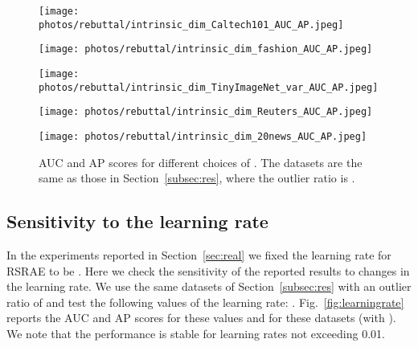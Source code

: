 \documentclass{article} \usepackage{iclr2020_conference,times}
\def\Secref#1{Section~\ref{#1}}
\begin{document}
\begin{figure}[htbp]
\centering
\begin{minipage}[t]{0.48\textwidth}
\centering
\texttt{[image: photos/rebuttal/intrinsic\_dim\_Caltech101\_AUC\_AP.jpeg]}
\end{minipage}
\begin{minipage}[t]{0.48\textwidth}
\centering
\texttt{[image: photos/rebuttal/intrinsic\_dim\_fashion\_AUC\_AP.jpeg]}
\end{minipage}


\centering
\begin{minipage}[t]{0.48\textwidth}
\centering
\texttt{[image: photos/rebuttal/intrinsic\_dim\_TinyImageNet\_var\_AUC\_AP.jpeg]}

\end{minipage}
\begin{minipage}[t]{0.48\textwidth}
\centering
\texttt{[image: photos/rebuttal/intrinsic\_dim\_Reuters\_AUC\_AP.jpeg]}
\end{minipage}


\centering
\begin{minipage}[t]{0.48\textwidth}
\centering
\texttt{[image: photos/rebuttal/intrinsic\_dim\_20news\_AUC\_AP.jpeg]}

\end{minipage}


\caption{AUC and AP scores for different choices of . The datasets are the same as those in \Secref{subsec:res}, where the outlier ratio is .
\label{fig:intrinsicdim}
}
\end{figure}




\newpage
\subsection{Sensitivity to the learning rate}
\label{subsec:learningrate}


In the experiments reported in \Secref{sec:real} we fixed the learning rate for RSRAE to be . Here we check the sensitivity of the reported results to changes in the learning rate.
We use the same datasets of \Secref{subsec:res} with an outlier ratio of  and test the following values of the learning rate: .  Fig.~\ref{fig:learningrate} reports the AUC and AP scores for these values and for these datasets (with ). 
We note that the performance is stable for learning rates not exceeding 0.01. 
\end{document}
